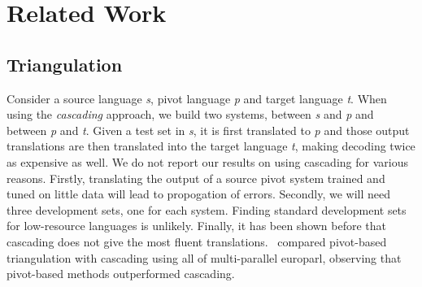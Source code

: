 \chapter{Related Work}

\section{Triangulation}
Consider a source language \emph{s}, pivot language \emph{p} and target language \emph{t}. When using the \emph{cascading} approach, we build two systems, between \emph{s} and \emph{p} and between \emph{p} and \emph{t}. Given a test set in \emph{s}, it is first translated to \emph{p} and those output translations are then translated into the target language \emph{t}, making decoding twice as expensive as well. We do not report our results on using cascading for various reasons. Firstly, translating the output of a source pivot system trained and tuned on little data will lead to propogation of errors. Secondly, we will need three development sets, one for each system. Finding standard development sets for low-resource languages is unlikely. Finally, it has been shown before that cascading does not give the most fluent translations.~\cite{Utiyama:07} compared pivot-based triangulation with cascading using all of multi-parallel europarl, observing that pivot-based methods outperformed cascading.

